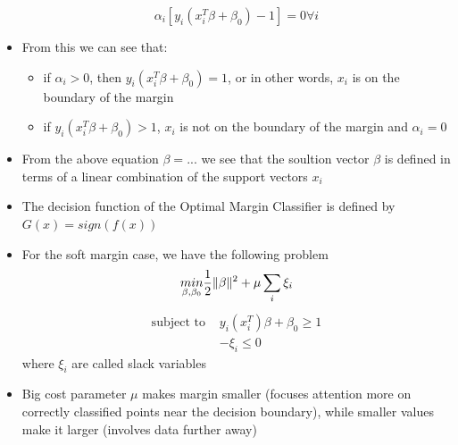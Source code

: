 \begin{itemize}
        $$\alpha_i [y_i (x_i^T \beta + \beta_0) - 1] = 0 \forall i$$
    \item
        From this we can see that:
        \begin{itemize}
            \item
                if $\alpha_i > 0$, then $y_i (x_i^T \beta + \beta_0) = 1$, or in other words, $x_i$ is on the boundary of the margin
            \item
                if $y_i(x_i^T \beta + \beta_0) > 1$, $x_i$ is not on the boundary of the margin and $\alpha_i = 0$
        \end{itemize}
    \item
        From the above equation $\beta = ...$ we see that the soultion vector $\beta$ is defined in terms of a linear combination of the support vectors $x_i$
    \item
        The decision function of the Optimal Margin Classifier is defined by $G(x) = sign(f(x))$\\

    \item
        For the soft margin case, we have the following problem
        $$\underset{\beta, \beta_0}{min}\frac{\displaystyle 1}{\displaystyle 2} \lVert\beta\rVert^2 + \mu \sum_i \xi_i$$
        \begin{align*}
            \text{subject to } & y_i (x_i^T)\beta + \beta_0 \geq 1\\
            & -\xi_i \leq 0
        \end{align*}
        where $\xi_i$ are called slack variables
    \item
        Big cost parameter $\mu$ makes margin smaller (focuses attention more on correctly classified points near the decision boundary), while smaller values make it larger (involves data further away)
\end{itemize}

